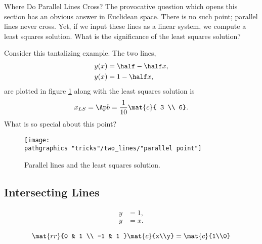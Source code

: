 Where Do Parallel Lines Cross? The provocative question which opens this section has an obvious answer in Euclidean space. There is no such point; parallel lines never cross. Yet, if we input these lines as a linear system, we compute a least squares solution. What is the significance of the least squares solution?

Consider this tantalizing example. The two lines,
  \begin{equation*}   %
    \begin{split}
      y(x) &= \half - \half x, \\
      y(x) &= 1 - \half x,
    \end{split}
  \end{equation*}
are plotted in figure \ref{fig:tantalizing} along with the least squares solution is 
  \begin{equation*}   %
      x_{LS} = \Ap b = \frac{1}{10}\mat{c}{ 3 \\ 6}.
  \end{equation*}
What is so special about this point?
\begin{figure}[htbp] %
   \centering
     \texttt{[image: \\pathgraphics "tricks"/two\_lines/"parallel point"]} 
   \caption{Parallel lines and the least squares solution.}
   \label{fig:tantalizing}
\end{figure}

\subsection{Intersecting Lines}
  \begin{equation*}   %
   \begin{split}
      y &= 1, \\
      y &= x .
   \end{split}
  \end{equation*}

  \begin{equation*}   %
      \mat{rr}{0 & 1 \\ -1 & 1 }\mat{c}{x\\y} = \mat{c}{1\\0}
  \end{equation*}


